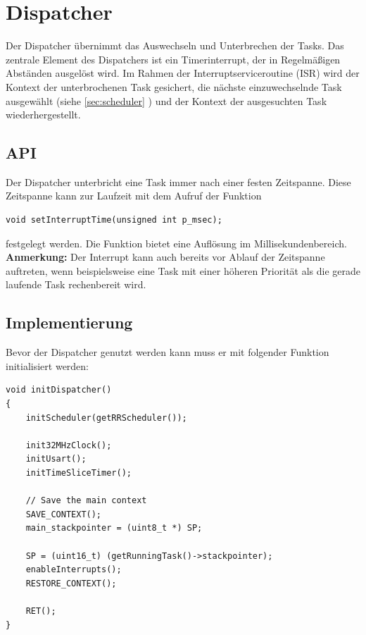 \documentclass[fontsize=12pt, toc=bibliography, notitlepage]{scrreprt}
\newcommand{\refnn}[1]{\ref{#1} \nameref{#1}}
\begin{document}
\section{Dispatcher}
\label{sec:dispatcher}
Der Dispatcher übernimmt das Auswechseln und Unterbrechen der Tasks. Das zentrale Element des Dispatchers ist ein Timerinterrupt, der in Regelmäßigen Abständen ausgelöst wird. Im Rahmen der Interruptserviceroutine (ISR) wird der Kontext der unterbrochenen Task gesichert, die nächste einzuwechselnde Task ausgewählt (siehe \refnn{sec:scheduler}) und der Kontext der ausgesuchten Task wiederhergestellt. 

\subsection{API}
\label{subsec:dispatcher-api}
Der Dispatcher unterbricht eine Task immer nach einer festen Zeitspanne. Diese Zeitspanne kann zur Laufzeit mit dem Aufruf der Funktion 

\begin{lstlisting}[title=dispatcher.h]
void setInterruptTime(unsigned int p_msec);
\end{lstlisting}

festgelegt werden. Die Funktion bietet eine Auflösung im Millisekundenbereich.\\
\textbf{Anmerkung:} Der Interrupt kann auch bereits vor Ablauf der Zeitspanne auftreten, wenn beispielsweise eine Task mit einer höheren Priorität als die gerade laufende Task rechenbereit wird.

\subsection{Implementierung}
\label{subsec:dispatcher-impl}
Bevor der Dispatcher genutzt werden kann muss er mit folgender Funktion initialisiert werden:

\begin{lstlisting}[title=dispatcher.c]
void initDispatcher()
{
	initScheduler(getRRScheduler());
	
	init32MHzClock();
	initUsart();
	initTimeSliceTimer();
	
	// Save the main context
	SAVE_CONTEXT();
	main_stackpointer = (uint8_t *) SP;
	
	SP = (uint16_t) (getRunningTask()->stackpointer);
	enableInterrupts();
	RESTORE_CONTEXT();
	
	RET();
}
\end{lstlisting}
\end{document}
